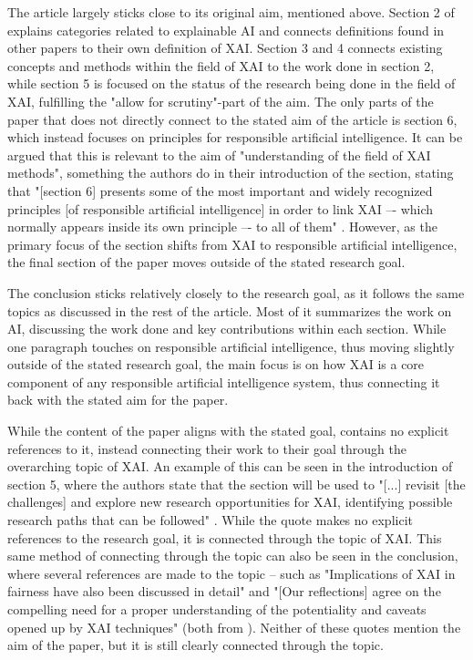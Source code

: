 The article largely sticks close to its original aim, mentioned above. Section 2 of \textcite{Barredo_2020} explains categories related to explainable AI and connects definitions found in other papers to their own definition of XAI. Section 3  and 4 connects existing concepts and methods within the field of XAI to the work done in section 2, while section 5 is focused on the status of the research being done in the field of XAI, fulfilling the "allow for scrutiny"-part of the aim. The only parts of the paper that does not directly connect to the stated aim of the article is section 6, which instead focuses on principles for responsible artificial intelligence. It can be argued that this is relevant to the aim of "understanding of the field of XAI methods", something the authors do in their introduction of the section, stating that "[section 6] presents some of the most important and widely recognized principles [of responsible artificial intelligence] in order to link XAI –- which normally appears inside its own principle –- to all of them" \parencite[p.103]{Barredo_2020}. However, as the primary focus of the section shifts from XAI to responsible artificial intelligence, the final section of the paper moves outside of the stated research goal.

The conclusion sticks relatively closely to the research goal, as it follows the same topics as discussed in the rest of the article. Most of it summarizes the work on AI, discussing the work done and key contributions within each section. While one paragraph touches on responsible artificial intelligence, thus moving slightly outside of the stated research goal, the main focus is on how XAI is a core component of any responsible artificial intelligence system, thus connecting it back with the stated aim for the paper.

While the content of the paper aligns with the stated goal, \textcite{Barredo_2020} contains no explicit references to it, instead connecting their work to their goal through the overarching topic of XAI. An example of this can be seen in the introduction of section 5, where the authors state that the section will be used to "[...] revisit [the challenges] and explore new research opportunities for XAI, identifying possible research paths that can be followed" \parencite[p.99]{Barredo_2020}. While the quote makes no explicit references to the research goal, it is connected through the topic of XAI. This same method of connecting through the topic can also be seen in the conclusion, where several references are made to the topic -- such as "Implications of XAI in fairness have also been discussed in detail" and "[Our reflections] agree on the compelling need for a proper understanding of the potentiality and caveats opened up by XAI techniques" (both from \cite[p.108]{Barredo_2020}). Neither of these quotes mention the aim of the paper, but it is still clearly connected through the topic.

